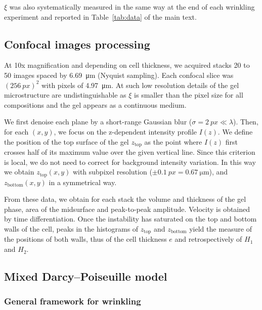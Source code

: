 \documentclass[twocolumn,superscriptaddress,showpacs,preprintnumbers,
amsmath,amssymb,prl]{revtex4-1}
\begin{document}
$\xi$ was also systematically measured in the same way at the end of each wrinkling experiment and reported in Table~\ref{tab:data} of the main text. %



\subsection*{Confocal images processing}

At 10x magnification and depending on cell thickness, we acquired stacks 20 to 50 images spaced by \SI{6.69}{\micro\metre} (Nyquist sampling). Each confocal slice was $(\SI{256}{px})^2$ with pixels of \SI{4.97}{\micro\metre}. At such low resolution details of the gel microstructure are undistinguishable as $\xi$ is smaller than the pixel size for all compositions and the gel appears as a continuous medium.

We first denoise each plane by a short-range Gaussian blur ($\sigma=\SI{2}{px}\ll\lambda$). Then, for each $(x,y)$, we focus on the z-dependent intensity profile $I(z)$. We define the position of the top surface of the gel $z_\text{top}$ as the point where $I(z)$ first crosses half of its maximum value over the given vertical line. Since this criterion is local, we do not need to correct for background intensity variation. In this way we obtain $z_\text{top}(x,y)$ with subpixel resolution ($\pm\SI{0.1}{px}=\SI{0.67}{\micro\metre}$), and $z_\text{bottom}(x,y)$ in a symmetrical way.

From these data, we obtain for each stack the volume and thickness of the gel phase, area of the midsurface and peak-to-peak amplitude. Velocity is obtained by time differentiation. Once the instability has saturated on the top and bottom walls of the cell, peaks in the histograms of $z_\text{top}$ and $z_\text{bottom}$ yield the measure of the positions of both walls, thus of the cell thickness $e$ and retrospectively of $H_1$ and $H_2$.



\subsection*{Mixed Darcy--Poiseuille model}

\subsubsection*{General framework for wrinkling}
\end{document}
